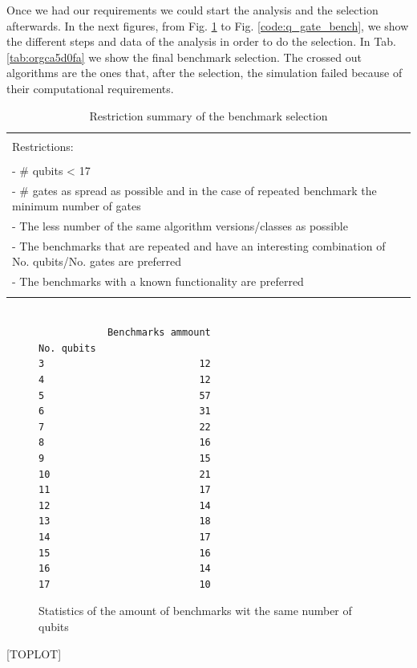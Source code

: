 Once we had our requirements we could start the analysis and the selection afterwards.
In the next figures, from Fig. \ref{code:no_q_statistics} to Fig. \ref{code:q_gate_bench}, we show the different steps and data of the analysis in order to do the selection.
In Tab. \ref{tab:orgca5d0fa} we show the final benchmark selection.
The crossed out algorithms are the ones that, after the selection, the simulation failed because of their computational requirements.
\begin{table}[htbp]
\caption{\label{tab:org7d6d50b}
Restriction summary of the benchmark selection}
\centering
\begin{tabular}{|l|}
\hline
\\
Restrictions:\\
\\
- \# qubits < 17\\
- \# gates as spread as possible and in the case of repeated benchmark the minimum number of gates\\
- The less number of the same algorithm versions/classes as possible\\
- The benchmarks that are repeated and have an interesting combination of No. qubits/No. gates are  preferred\\
- The benchmarks with a known functionality are preferred\\
\\
\hline
\end{tabular}
\end{table}

\begin{figure}
\centering

\begin{verbatim}

            Benchmarks ammount
No. qubits
3                           12
4                           12
5                           57
6                           31
7                           22
8                           16
9                           15
10                          21
11                          17
12                          14
13                          18
14                          17
15                          16
16                          14
17                          10

\end{verbatim}


\label{code:no_q_statistics}
\caption{Statistics of the amount of benchmarks wit the same number of qubits}
\end{figure}
[TOPLOT]

